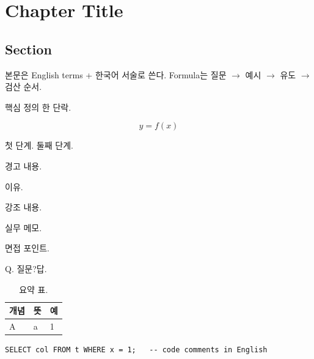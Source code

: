 \documentclass[11pt]{report}
\begin{document}
\chapter{Chapter Title}
\section{Section}
본문은 English terms + 한국어 서술로 쓴다. Formula는 질문 \ensuremath{\to} 예시 \ensuremath{\to} 유도 \ensuremath{\to} 검산 순서.

\begin{keybox}
핵심 정의 한 단락.
\end{keybox}

\begin{formulabox}[Formula]
\[ y = f(x) \]
\end{formulabox}

\begin{workout}[예제 제목]
 첫 단계. 
 둘째 단계. 
\end{workout}

\begin{warnbox}[주의]경고 내용.\end{warnbox}
\begin{whybox}이유.\end{whybox}
\begin{prof}[강의 포인트]강조 내용.\end{prof}
\begin{insight}[실무]실무 메모.\end{insight}
\begin{career}[면접]면접 포인트.\end{career}
\begin{qa}{Q. 질문?}답.\end{qa}

\begin{table}[h]\centering\small
\begin{tabular}{@{}lll@{}}\toprule 개념 & 뜻 & 예\\\midrule A & a & 1\\\bottomrule\end{tabular}
\caption{요약 표.}
\end{table}

\begin{lstlisting}
SELECT col FROM t WHERE x = 1;   -- code comments in English
\end{lstlisting}
\end{document}
